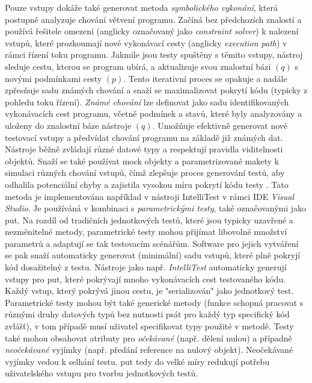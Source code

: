 \documentclass[czech, ma, kiv, he, iso690numb, pdf, viewonly]{fasthesis}
\begin{document}
        Pouze vstupy dokáže také generovat metoda \textit{symbolického vykonání}, která postupně analyzuje chování větvení programu. Začíná bez předchozích znalostí a používá řešitele omezení (anglicky označovaný jako \textit{constraint solver}) k nalezení vstupů, které prozkoumají nové vykonávací cesty (anglicky \textit{execution path}) v rámci řízení toku programu. Jakmile jsou testy spuštěny s těmito vstupy, nástroj sleduje cestu, kterou se program ubírá, a aktualizuje svou znalostní bázi \((q)\) s novými podmínkami cesty \((p)\). Tento iterativní proces se opakuje a nadále zpřesňuje sadu známých chování a snaží se maximalizovat pokrytí kódu (typicky z pohledu toku řízení). \textit{Známé chování} lze definovat jako sadu identifikovaných vykonávacích cest programu, včetně podmínek a stavů, které byly analyzovány a uloženy do znalostní báze nástroje \((q)\). Umožňuje efektivně generovat nové testovací vstupy a předvídat chování programu na základě již známých dat. Nástroje běžně zvládají různé datové typy a respektují pravidla viditelnosti objektů. Snaží se také používat mock objekty a parametrizované makety k simulaci různých chování vstupů, čímž zlepšuje proces generování testů, aby odhalila potenciální chyby a zajistila vysokou míru pokrytí kódu testy \cite{parizek_symbolic_execution}. Tato metoda je implementována například v nástroji IntelliTest v rámci IDE \textit{Visual Studio}. Je používáná v kombinaci s \emph{parametrickými testy}, také označovanými jako \acrshort{put}. Na rozdíl od tradičních jednotkových testů, které jsou typicky uzavřené a nezměnitelné metody, parametrické testy mohou přijímat libovolné množství parametrů a adaptují se tak testovacím scénářům. Software pro jejich vytváření se pak snaží automaticky generovat (minimální) sadu vstupů, které plně pokryjí kód dosažitelný z testu. Nástroje jako např. \textit{IntelliTest} automaticky generují vstupy pro \acrshort{put}, které pokrývají mnoho vykonávacích cest testovaného kódu. Každý vstup, který pokrývá jinou cestu, je "serializován" jako jednotkový test. Parametrické testy mohou být také generické metody (funkce schopná pracovat s různými druhy datových typů bez nutnosti psát pro každý typ specifický kód zvlášť), v tom případě musí uživatel specifikovat typy použité v metodě. Testy také mohou obsahovat atributy pro \emph{očekávané} (např. dělení nulou) a případně \emph{neočekávané} vyjímky (např. předání reference na nulový objekt). Neočekávané vyjímky vedou k selhání testu. \acrshort{put} tedy do velké míry redukují potřebu uživatelského vstupu pro tvorbu jednotkových testů. \cite{IntelliTestInputGeneration2023} \cite{microsoft2023testgen}
\end{document}
